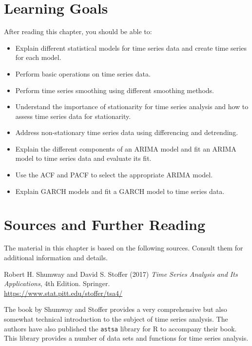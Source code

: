 %
%
\section*{Learning Goals}

After reading this chapter, you should be able to:
\begin{itemize}
   \item Explain different statistical models for time series data and create time series for each model.
   \item Perform basic operations on time series data.
   \item Perform time series smoothing using different smoothing methods.
   \item Understand the importance of stationarity for time series analysis and how to assess time series data for stationarity.
   \item Address non-stationary time series data using differencing and detrending.
   \item Explain the different components of an ARIMA model and fit an ARIMA model to time series data and evaluate its fit. 
   \item Use the ACF and PACF to select the appropriate ARIMA model.
   \item Explain GARCH models and fit a GARCH model to time series data.
\end{itemize}

\section*{Sources and Further Reading}

The material in this chapter is based on the following sources. Consult them for additional information and details.

\begin{tcolorbox}[colback=LavenderBlush2]
Robert H. Shumway and David S. Stoffer (2017) \emph{Time Series Analysis and Its Applications}, 4th Edition. Springer.\\

\vspace{.5\baselineskip}
\url{https://www.stat.pitt.edu/stoffer/tsa4/}
\end{tcolorbox}

The book by Shumway and Stoffer provides a very comprehensive but also somewhat technical introduction to the subject of time series analysis. The authors have also published the \texttt{astsa} library for R to accompany their book. This library provides a number of data sets and functions for time series analysis. 

